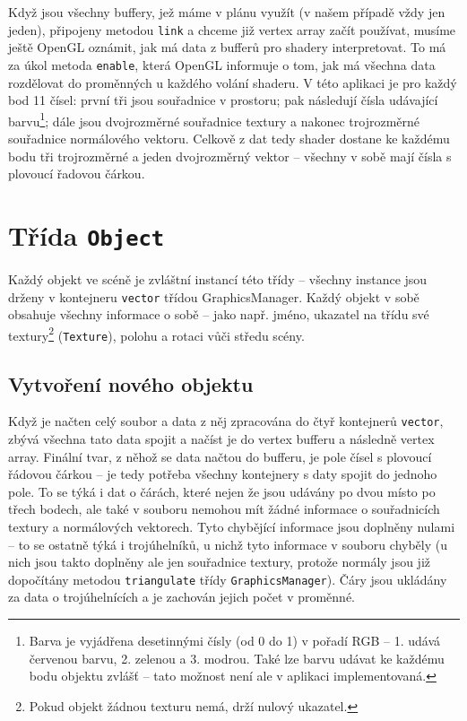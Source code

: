 \documentclass[a4paper, 11pt]{report}
\begin{document}
Když jsou všechny buffery, jež máme v plánu využít (v našem případě vždy jen jeden), připojeny metodou \texttt{link} a chceme již vertex array začít používat, musíme ještě OpenGL oznámit, jak má data z bufferů pro shadery interpretovat. To má za úkol metoda \texttt{enable}, která OpenGL informuje o tom, jak má všechna data rozdělovat do proměnných u každého volání shaderu. V této aplikaci je pro každý bod 11 čísel: první tři jsou souřadnice v prostoru; pak následují čísla udávající barvu\footnote{Barva je vyjádřena desetinnými čísly (od 0 do 1) v pořadí RGB -- 1. udává červenou barvu, 2. zelenou a 3. modrou. Také lze barvu udávat ke každému bodu objektu zvlášť -- tato možnost není ale v aplikaci implementovaná.}; dále jsou dvojrozměrné souřadnice textury a nakonec trojrozměrné souřadnice normálového vektoru. Celkově z dat tedy shader dostane ke každému bodu tři trojrozměrné a jeden dvojrozměrný vektor -- všechny v sobě mají čísla s plovoucí řadovou čárkou.

\section{\label{objekt}Třída \texttt{Object}}
Každý objekt ve scéně je zvláštní instancí této třídy -- všechny instance jsou drženy v kontejneru \texttt{vector} třídou GraphicsManager. Každý objekt v sobě obsahuje všechny informace o sobě -- jako např. jméno, ukazatel na třídu své textury\footnote{Pokud objekt žádnou texturu nemá, drží nulový ukazatel.} (\texttt{Texture}), polohu a rotaci vůči středu scény.

\subsection{Vytvoření nového objektu}
Když je načten celý soubor a data z něj zpracována do čtyř kontejnerů \texttt{vector}, zbývá všechna tato data spojit a načíst je do vertex bufferu a následně vertex array. Finální tvar, z něhož se data načtou do bufferu, je pole čísel s plovoucí řádovou čárkou -- je tedy potřeba všechny kontejnery s daty spojit do jednoho pole. To se týká i dat o čárách, které nejen že jsou udávány po dvou místo po třech bodech, ale také v souboru nemohou mít žádné informace o souřadnicích textury a normálových vektorech. Tyto chybějící informace jsou doplněny nulami -- to se ostatně týká i trojúhelníků, u nichž tyto informace v souboru chyběly (u nich jsou takto doplněny ale jen souřadnice textury, protože normály jsou již dopočítány metodou \texttt{triangulate} třídy \texttt{GraphicsManager}). Čáry jsou ukládány za data o trojúhelnících a je zachován jejich počet v proměnné.
\end{document}
